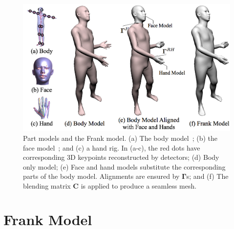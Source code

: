 %


\begin{figure}[t]
	\includegraphics[trim={1cm 0 0 0 }, width=\columnwidth]{tbc_figures/building_frank_3}
	\caption{Part models and the Frank model. (a) The body model~\cite{Loper2015}; (b) the face model~\cite{cao2014facewarehouse}; and (c) a hand rig. In (a-c), the red dots have corresponding 3D keypoints reconstructed by detectors; (d) Body only model; (e) Face and hand models substitute the corresponding parts of the body model. Alignments are ensured by  $\bm{\Gamma}$s; and (f) The blending matrix $\mathbf{C}$ is applied to produce a seamless mesh.} %
	\label{fig:frankenstein_part_aligned}
\end{figure}

\section{Frank Model}

